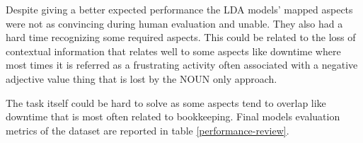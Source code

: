 Despite giving a better expected performance the LDA models' mapped aspects were not
as convincing during human evaluation and unable.
They also had a hard time recognizing some required aspects.
This could be related to the loss of contextual information that relates well to
some aspects like downtime where most times it is referred as a frustrating activity
often associated with a negative adjective value thing that is lost by the NOUN only approach.

The task itself could be hard to solve as some aspects tend to overlap like downtime that is most
often related to bookkeeping.
Final models evaluation metrics of the dataset are reported in table \ref{performance-review}.
